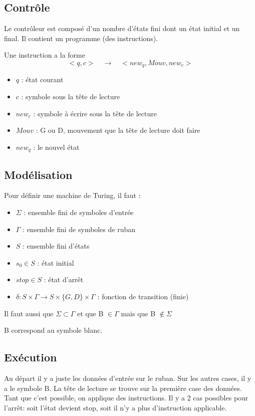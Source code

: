 \subsection{Contrôle}
\label{ssub:contr_le}
Le contrôleur est composé d'un nombre d'états fini dont un état initial et un
final. Il contient un programme (des instructions).

\begin{mydef} Une instruction a la forme
	$$<q,c> \quad \rightarrow \quad <new_q, Mouv, new_c>$$
	\begin{itemize}
		\item $q$ : état courant
		\item $c$ : symbole sous la tête de lecture
		\item $new_c$ : symbole à écrire sous la tête de lecture
		\item $Mouv$ : G ou D, mouvement que la tête de lecture doit faire
		\item $new_q$ : le nouvel état
	\end{itemize}
\end{mydef}


\subsection{Modélisation}
Pour définir une machine de Turing, il faut :
\begin{itemize}
	\item $\Sigma$ : ensemble fini de symboles d'entrée
	\item $\Gamma$ : ensemble fini de symboles de ruban
	\item $S$ : ensemble fini d'états
	\item $s_0 \in S$ : état initial
	\item $stop \in S$ : état d'arrêt
	\item $\delta : S \times \Gamma \rightarrow S \times \{G,D\}
	\times \Gamma$ : fonction de transition (finie)
\end{itemize}
Il faut aussi que $\Sigma \subset \Gamma$ et que B $\in \Gamma$ mais que B
$\notin \Sigma$

\begin{mydef}
		B correspond au symbole blanc.
\end{mydef}

\subsection{Exécution}
Au départ il y a juste les données d'entrée sur le ruban. Sur les autres cases, il y a
le symbole B. La tête de lecture se trouve sur la première case des données. Tant que
c'est possible, on applique des instructions. Il y a 2 cas possibles pour l'arrêt: soit
l'état devient stop, soit il n'y a plus d'instruction applicable.

